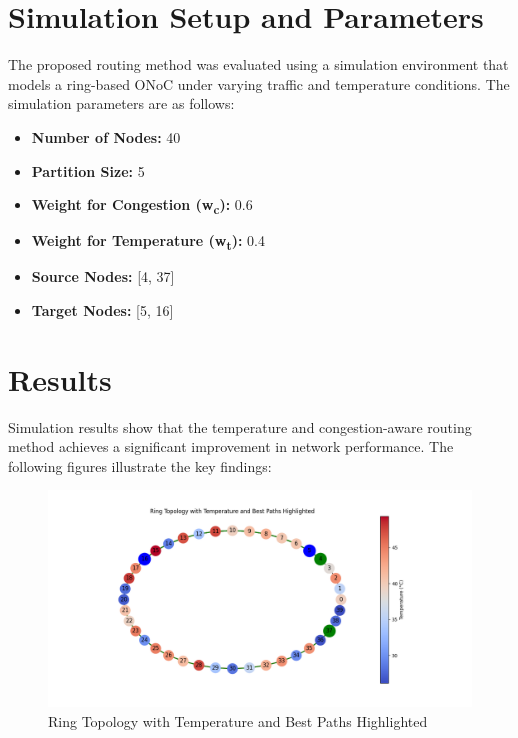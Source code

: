 \documentclass[conference]{IEEEtran}
\begin{document}
\section{Simulation Setup and Parameters}
The proposed routing method was evaluated using a simulation environment that models a ring-based ONoC under varying traffic and temperature conditions. The simulation parameters are as follows:
\begin{itemize}
    \item \textbf{Number of Nodes:} 40
    \item \textbf{Partition Size:} 5%
    \item \textbf{Weight for Congestion (w\textsubscript{c}):} 0.6
    \item \textbf{Weight for Temperature (w\textsubscript{t}):} 0.4
    \item \textbf{Source Nodes:} [4, 37]
    \item \textbf{Target Nodes:} [5, 16]
\end{itemize}

\section{Results}
Simulation results show that the temperature and congestion-aware routing method achieves a significant improvement in network performance. The following figures illustrate the key findings:

\begin{figure}[h]
    \centering
    \includegraphics[width=\linewidth]{ring_topology.png}
    \caption{Ring Topology with Temperature and Best Paths Highlighted}
    \label{fig:ring_topology}
\end{figure}
\end{document}

